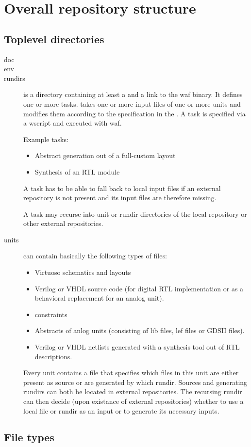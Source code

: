 \chapter{Overall repository structure}
\section{Toplevel directories}
\begin{description}%
	\item[doc]
	\item[env]
	\item[rundirs]
		is a directory containing at least a \wscript and a link to the waf binary. It defines one or more tasks.
		takes one or more input files of one or more units and modifies them according to the specification in the \wscript.
		A task is specified via a wscript and executed with waf.

		Example tasks:
		\begin{itemize}
			\item Abstract generation out of a full-custom layout 
			\item Synthesis of an RTL module
		\end{itemize}

		A task has to be able to fall back to local input files if an external repository is not present and its input files are therefore missing.

		A task may recurse into unit or rundir directories of the local repository or other external repositories.

	\item[units]
		can contain basically the following types of files:
		\begin{itemize}
			\item Virtuoso schematics and layouts
			\item Verilog or VHDL source code (for digital RTL implementation or as a behavioral replacement for an analog unit).
			\item constraints
			\item Abstracts of anlog units (consisting of lib files, lef files or GDSII files).
			\item Verilog or VHDL netlists generated with a synthesis tool out of RTL descriptions.
		\end{itemize}

		Every unit contains a file that specifies which files in this unit are either present as source or are generated by which rundir.
		Sources and generating rundirs can both be located in external repositories.
		The recursing rundir can then decide (upon existance of external repositories) whether to use a local file or rundir as an input or to generate its necessary inputs.
\end{description}

\section{File types}
